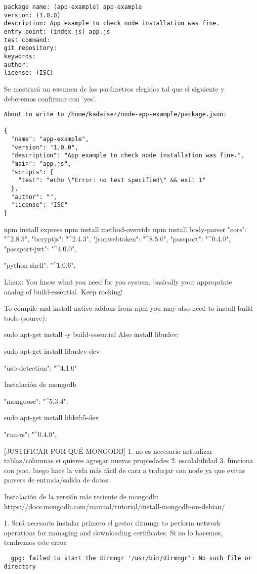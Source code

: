 \begin{verbatim}
package name: (app-example) app-example
version: (1.0.0)
description: App example to check node installation was fine.
entry point: (index.js) app.js
test command:
git repository:
keywords:
author:
license: (ISC)
\end{verbatim}

Se mostrará un resumen de los parámetros elegidos tal que el siguiente y deberemos confirmar con 'yes'.

\begin{verbatim}
About to write to /home/kadaiser/node-app-example/package.json:

{
  "name": "app-example",
  "version": "1.0.0",
  "description": "App example to check node installation was fine.",
  "main": "app.js",
  "scripts": {
    "test": "echo \"Error: no test specified\" && exit 1"
  },
  "author": "",
  "license": "ISC"
}
\end{verbatim}

npm install express
npm install method-override
npm install body-parser
"cors": "^2.8.5",
"bcryptjs": "^2.4.3",
"jsonwebtoken": "^8.5.0",
"passport": "^0.4.0",
"passport-jwt": "^4.0.0",

"python-shell": "^1.0.6",

Linux:
You know what you need for you system, basically your appropriate analog of build-essential. Keep rocking!

To compile and install native addons from npm you may also need to install build tools (source):

sudo apt-get install -y build-essential
Also install libudev:

sudo apt-get install libudev-dev

"usb-detection": "^4.1.0"

Instalación de mongodb

"mongoose": "^5.3.4",

sudo apt-get install libkrb5-dev

"run-rs": "^0.4.0",


[JUSTIFICAR POR QUÉ MONGODB]
1. no es necesario actualizar tablas/columnas si quieres agregar nuevas propiedades
2. escalabilidad
3. funciona con json, luego hace la vida más fácil de cara a trabajar con node ya que evitas parsers de entrada/salida de datos.

Instalación de la versión más reciente de mongodb:
https://docs.mongodb.com/manual/tutorial/install-mongodb-on-debian/

1. Será necesario instalar primero el gestor dirmngr to perform network operations for managing and downloading certificates. Si no lo hacemos, tendremos este error:
\begin{verbatim}
  gpg: failed to start the dirmngr '/usr/bin/dirmngr': No such file or directory
\end{verbatim}

